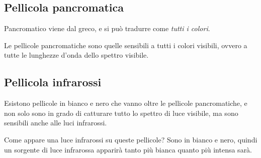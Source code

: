 %


\subsection{Pellicola pancromatica} \label{subsec:pellicolapan}
Pancromatico viene dal greco, e si può tradurre come \textit{tutti i colori}.

Le pellicole pancromatiche sono quelle sensibili a tutti i colori visibili, ovvero a tutte le lunghezze d'onda dello spettro visibile.


\subsection{Pellicola infrarossi} \label{subsec:pellicolair}
Esistono pellicole in bianco e nero che vanno oltre le pellicole pancromatiche, e non solo sono in grado di catturare tutto lo spettro di luce visibile, ma sono sensibili anche alle luci infrarossi.

Come appare una luce infrarossi su queste pellicole? Sono in bianco e nero, quindi un sorgente di luce infrarossa apparirà tanto più bianca quanto più intensa sarà.